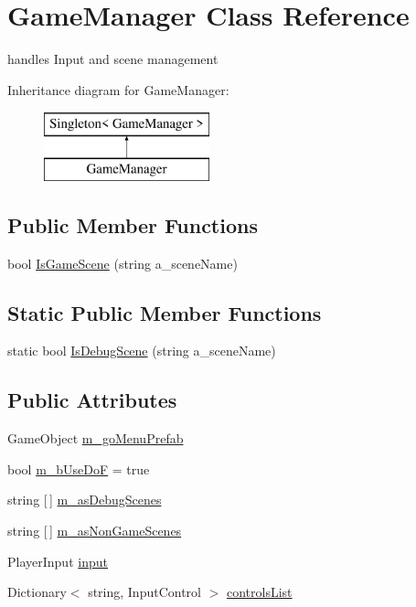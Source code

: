 \hypertarget{class_game_manager}{}\section{Game\+Manager Class Reference}
\label{class_game_manager}


handles Input and scene management  


Inheritance diagram for Game\+Manager\+:\begin{figure}[H]
\begin{center}
\leavevmode
\includegraphics[height=2.000000cm]{class_game_manager}
\end{center}
\end{figure}
\subsection*{Public Member Functions}
\begin{DoxyCompactItemize}
\item 
bool \mbox{\hyperlink{class_game_manager_ab83c7c6f5531d0591b0697fdf340a16c}{Is\+Game\+Scene}} (string a\+\_\+scene\+Name)
\end{DoxyCompactItemize}
\subsection*{Static Public Member Functions}
\begin{DoxyCompactItemize}
\item 
static bool \mbox{\hyperlink{class_game_manager_a746715f95f49db4565a3c52235021656}{Is\+Debug\+Scene}} (string a\+\_\+scene\+Name)
\end{DoxyCompactItemize}
\subsection*{Public Attributes}
\begin{DoxyCompactItemize}
\item 
Game\+Object \mbox{\hyperlink{class_game_manager_a5f2e8fddfab1df9b614ee8c19e190c89}{m\+\_\+go\+Menu\+Prefab}}
\item 
bool \mbox{\hyperlink{class_game_manager_a5f44a085c580d46869d434c58356acaf}{m\+\_\+b\+Use\+DoF}} = true
\item 
string \mbox{[}$\,$\mbox{]} \mbox{\hyperlink{class_game_manager_a08c09884a7b006f6e34b9a97791ad8e9}{m\+\_\+as\+Debug\+Scenes}}
\item 
string \mbox{[}$\,$\mbox{]} \mbox{\hyperlink{class_game_manager_aa64096e52946d57a561f6182aa56380e}{m\+\_\+as\+Non\+Game\+Scenes}}
\item 
Player\+Input \mbox{\hyperlink{class_game_manager_ab233485503b57111cd2c5aa0ddc3b0ec}{input}}
\item 
Dictionary$<$ string, Input\+Control $>$ \mbox{\hyperlink{class_game_manager_aa59964143f46f6d366aa576ab08c5a15}{controls\+List}}
\end{DoxyCompactItemize}
